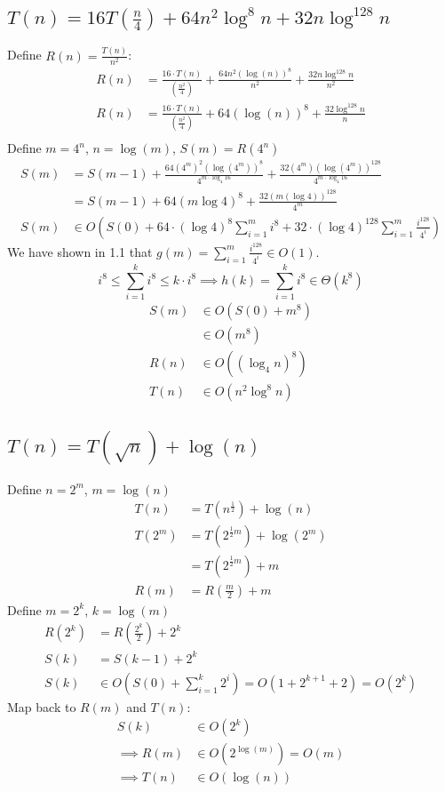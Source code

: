 \documentclass{article}
\begin{document}
\subsection{$T(n) = 16T(\frac{n}{4}) + 64n^2 \log^8 n + 32n \log^{128} n$}
Define $R(n) = \frac{T(n)}{n^2}$:
\begin{align*}
    R(n) &= \frac{16\cdot T(n)}{(\frac{n^2}{4})} + \frac{64n^2(\log(n))^8}{n^2} + \frac{32n\log^{128}n}{n^2}\\
    R(n) &= \frac{16\cdot T(n)}{(\frac{n^2}{4})} + 64(\log(n))^8 + \frac{32\log^{128}n}{n}\\
\end{align*}
Define $m = 4^n$, $n = \log(m)$, $S(m) = R(4^n)$
\begin{align*}
    S(m) &= S(m - 1) + \frac{64(4^m)^2(\log(4^m))^8}{4^{m\cdot \log_4 16}}+ \frac{32 (4^m) (\log(4^m))^{128}}{4^{m\cdot \log_4 16}}\\
    &= S(m - 1) + 64(m\log 4)^8 + \frac{32(m(\log 4))^{128}}{4^m}\\
    S(m) &\in O\left(S(0) + 64\cdot (\log 4)^8\sum_{i=1}^{m}i^8 + 32\cdot (\log 4)^{128}\sum_{i=1}^{m} \frac{i^{128}}{4^i}\right) 
\end{align*}
We have shown in 1.1 that $g(m) = \sum_{i=1}^{m} \frac{i^{128}}{4^i} \in O(1)$.\\
    \[i^8 \leq \sum_{i=1}^{k} i^8 \leq k\cdot i^8 \implies h(k) = \sum_{i=1}^{k}i^8 \in \Theta(k^8)\]
    \begin{align*}
        S(m) &\in O(S(0) + m^8)\\
        &\in O(m^8)\\
        R(n) &\in O((\log_4 n)^8)\\
        T(n) &\in O(n^2 \log^8n)
    \end{align*}


\subsection{$T(n) = T(\sqrt{n}) + \log(n)$}
Define $n = 2^m$, $m = \log(n)$ 
\begin{align*}
    T(n) &= T(n^{\frac{1}{2}}) + \log(n)\\
    T(2^m) &= T(2^{\frac{1}{2} m}) + \log(2^m)\\
    &= T(2^{\frac{1}{2} m}) + m\\
    R(m) &= R(\frac{m}{2}) + m
\end{align*}
Define $m = 2^k$, $k = \log(m)$
\begin{align*}
    R(2^k) &= R(\frac{2^k}{2}) + 2^k\\
    S(k) &= S(k-1) + 2^k\\
    S(k) &\in O(S(0) + \sum_{i=1}^{k} 2^i) = O(1 + 2^{k + 1} + 2) = O(2^k)
\end{align*}
Map back to $R(m)$ and $T(n)$:
\begin{align*}
    S(k) &\in O(2^k)\\
    \implies R(m) &\in O(2^{\log(m)}) = O(m)\\
    \implies T(n) &\in O(\log(n))
\end{align*}
\end{document}
